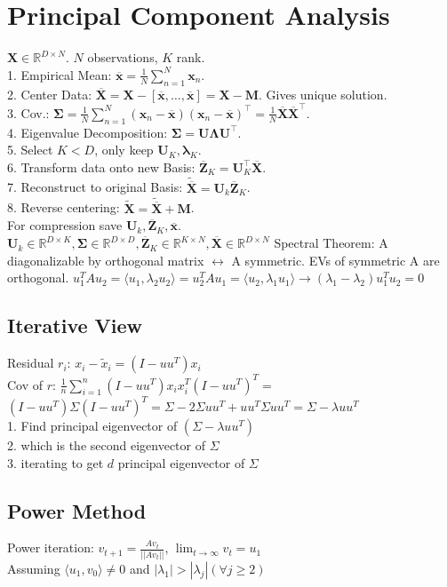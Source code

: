 \section{Principal Component Analysis}
$\mathbf{X} \in \mathbb{R}^{D \times N}$. $N$ observations, $K$ rank.\\
1. Empirical Mean: $\overline{\mathbf{x}} = \frac{1}{N} \sum_{n=1}^N \mathbf{x}_n$.\\
2. Center Data: $\overline{\mathbf{X}} = \mathbf{X} - [\overline{\mathbf{x}}, \ldots, \overline{\mathbf{x}}] = \mathbf{X} - \mathbf{M}$. Gives unique solution.\\
3. Cov.: $\boldsymbol{\Sigma} = \frac{1}{N	} \sum_{n=1}^N (\mathbf{x}_n - \overline{\mathbf{x}}) (\mathbf{x}_n - \overline{\mathbf{x}})^\top = \frac{1}{N} \overline{\mathbf{X}}\overline{\mathbf{X}}^\top$.\\
4. Eigenvalue Decomposition: $\boldsymbol{\Sigma} = \mathbf{U} \boldsymbol{\Lambda} \mathbf{U}^\top$.\\
5. Select $K < D$, only keep $\mathbf{U}_K, \boldsymbol{\lambda}_K$.\\
6. Transform data onto new Basis: $\overline{\mathbf{Z}}_K = \mathbf{U}_K^\top \overline{\mathbf{X}}$.\\
7. Reconstruct to original Basis: $\tilde{\overline{\mathbf{X}}} = \mathbf{U}_k \overline{\mathbf{Z}}_K$.\\
8. Reverse centering: $\tilde{\mathbf{X}} = \tilde{\overline{\mathbf{X}}} + \mathbf{M}$.\\
For compression save $\mathbf{U}_k, \overline{\mathbf{Z}}_K, \overline{\mathbf{x}}$.\\
$\mathbf{U}_k \in \mathbb{R}^{D \times K}, \boldsymbol{\Sigma} \in \mathbb{R}^{D \times D}, \overline{\mathbf{Z}}_K \in \mathbb{R}^{K \times N}, \overline{\mathbf{X}} \in \mathbb{R}^{D \times N}$
Spectral Theorem: A diagonalizable by orthogonal matrix $\leftrightarrow$ A symmetric. EVs of symmetric A are orthogonal. 
$u_1^T Au_2 = \langle u_1, \lambda_2u_2 \rangle =  u_2^T Au_1 =\langle u_2, \lambda_1u_1 \rangle \rightarrow (\lambda_1 -\lambda_2)u_1^Tu_2 = 0 $
\subsection*{Iterative View}
Residual $r_i$: $x_i - \tilde{x}_i = (I - uu^T)  x_i$\\
Cov of $r$:  $\frac{1}{n} \sum_{i=1}^n (I-uu^T)x_i x_i^T (I-uu^T)^T =$ \\
$(I-uu^T) \Sigma (I-uu^T)^T = \Sigma - 2\Sigma u u^T + u u^T \Sigma u u ^T = \Sigma - \lambda uu^T$ \\
1. Find principal eigenvector of $(\Sigma - \lambda u u^T)$\\
2. which is the second eigenvector of $\Sigma$\\
3. iterating to get $d$ principal eigenvector of $\Sigma$

\subsection*{Power Method}
Power iteration: $v_{t+1} = \frac{Av_t}{||Av_t||}$, $\lim_{t \rightarrow \infty} v_t = u_1$\\
Assuming $\langle u_1, v_0 \rangle \not = 0$ and $|\lambda_1| > |\lambda_j| (\forall j \geq 2)$
